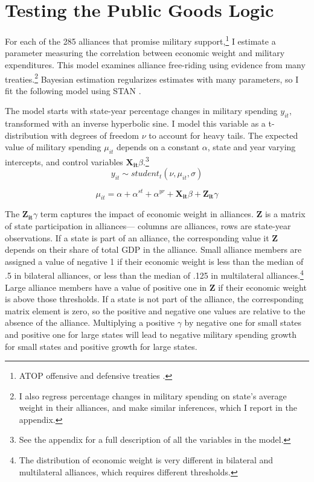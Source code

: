 \documentclass[12pt]{article}
\begin{document}
\section{Testing the Public Goods Logic}


For each of the 285 alliances that promise military support,\footnote{ATOP offensive and defensive treaties \citep{Leedsetal2002}.} I estimate a parameter measuring the correlation between economic weight and military expenditures. 
This model examines alliance free-riding using evidence from many treaties.\footnote{I also regress percentage changes in military spending on state's average weight in their alliances, and make similar inferences, which I report in the appendix.}
Bayesian estimation regularizes estimates with many parameters, so I fit the following model using STAN \citep{Carpenteretal2016}.


The model starts with state-year percentage changes in military spending $y_{it}$, transformed with an inverse hyperbolic sine.
I model this variable as a t-distribution with degrees of freedom $\nu$ to account for heavy tails.
The expected value of military spending $\mu_{it}$ depends on a constant $\alpha$, state and year varying intercepts, and control variables $\mathbf{X_{it}} \beta$.\footnote{See the appendix for a full description of all the variables in the model.} 
\begin{equation}
y_{it} \sim student_t(\nu, \mu_{it}, \sigma) 
\end{equation}

\begin{equation}
\mu_{it} = \alpha + \alpha^{st} + \alpha^{yr} + \mathbf{X_{it}} \beta + \mathbf{Z_{it}} \gamma
\end{equation}


The $\mathbf{Z_{it}} \gamma$ term captures the impact of economic weight in alliances.  
$\textbf{Z}$ is a matrix of state participation in alliances--- columns are alliances, rows are state-year observations.  
If a state is part of an alliance, the corresponding value it $\textbf{Z}$ depends on their share of total GDP in the alliance. 
Small alliance members are assigned a value of negative 1 if their economic weight is less than the median of .5 in bilateral alliances, or less than the median of .125 in multilateral alliances.\footnote{The distribution of economic weight is very different in bilateral and multilateral alliances, which requires different thresholds.}
Large alliance members have a value of positive one in $\textbf{Z}$ if their economic weight is above those thresholds. 
If a state is not part of the alliance, the corresponding matrix element is zero, so the positive and negative one values are relative to the absence of the alliance. 
Multiplying a positive $\gamma$ by negative one for small states and positive one for large states will lead to negative military spending growth for small states and positive growth for large states. 
\end{document}
